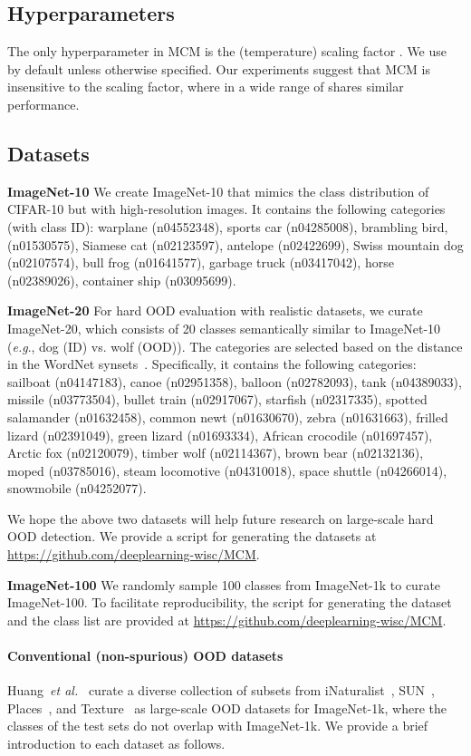 \documentclass{article}
\def\eg{\emph{e.g}., }
\def\etal{\emph{et al.}}
\begin{document}
\subsection{Hyperparameters} The only hyperparameter in MCM is the (temperature) scaling factor . We use  by default unless otherwise specified. Our experiments suggest that MCM is insensitive to the scaling factor, where  in a wide range of  shares similar performance.

\subsection{Datasets}

\textbf{ImageNet-10} We create ImageNet-10 that mimics the class distribution of CIFAR-10 but with high-resolution images. It contains the following categories (with class ID): warplane (n04552348), sports car (n04285008), brambling bird, (n01530575), Siamese cat (n02123597), antelope (n02422699), Swiss mountain dog (n02107574), bull frog (n01641577), garbage truck (n03417042), horse (n02389026), container ship (n03095699).

\textbf{ImageNet-20} For hard OOD evaluation with realistic datasets, we curate ImageNet-20, which consists of 20 classes semantically similar  to ImageNet-10 (\eg dog (ID) vs. wolf (OOD)). The categories are selected based on the distance in the WordNet synsets~\cite{fellbaum2010wordnet}. Specifically, it contains the following categories: sailboat (n04147183), canoe (n02951358), balloon (n02782093), tank (n04389033), missile (n03773504), bullet train (n02917067), starfish (n02317335), spotted salamander (n01632458), common newt (n01630670), zebra (n01631663), frilled lizard (n02391049), green lizard (n01693334), African crocodile (n01697457), Arctic fox (n02120079), timber wolf (n02114367), brown bear (n02132136), moped (n03785016), steam locomotive (n04310018), space shuttle (n04266014), snowmobile (n04252077).

We hope the above two datasets will help future research on large-scale hard OOD detection. We provide a script for generating the datasets at 
\url{https://github.com/deeplearning-wisc/MCM}.

\textbf{ImageNet-100} We randomly sample 100 classes from ImageNet-1k to curate ImageNet-100. To facilitate reproducibility, the script for generating the dataset and the class list are provided at \url{https://github.com/deeplearning-wisc/MCM}.

\paragraph{Conventional (non-spurious) OOD datasets} Huang~\etal~\cite{huang2021mos} curate a diverse collection of subsets from iNaturalist~\cite{van2018inaturalist}, SUN~\cite{xiao2010sun}, Places~\cite{zhou2017places}, and Texture~\cite{cimpoi2014describing} as large-scale OOD datasets for ImageNet-1k, where the classes of the test sets do not overlap with ImageNet-1k. We provide a brief introduction to each dataset as follows.
 
\end{document}
